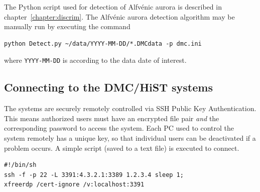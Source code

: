 The Python script used for detection of Alfvénic aurora is described in chapter~\ref{chapter:discrim}.
The Alfvénic aurora detection algorithm \citep{cviono} may be manually run by executing the command
\begin{verbatim}
python Detect.py ~/data/YYYY-MM-DD/*.DMCdata -p dmc.ini
\end{verbatim}
where \texttt{YYYY-MM-DD} is according to the data date of interest.

\subsection{Connecting to the DMC/HiST systems}
The systems are securely remotely controlled via SSH Public Key Authentication.
This means authorized users must have an encrypted file pair \textit{and} the corresponding password to access the system.
Each PC used to control the system remotely has a unique key, so that individual users can be deactivated if a problem occurs.
A simple script (saved to a text file) is executed to connect.
\begin{verbatim}
#!/bin/sh
ssh -f -p 22 -L 3391:4.3.2.1:3389 1.2.3.4 sleep 1;
xfreerdp /cert-ignore /v:localhost:3391
\end{verbatim}


